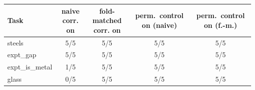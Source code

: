 \begin{tabular}{lcccc}
\toprule
Task & naive corr. on & fold-matched corr. on & perm.\ control on (naive) & perm.\ control on (f.-m.) \\
\midrule
steels & 5/5 & 5/5 & 5/5 & 5/5 \\
expt\_gap & 5/5 & 5/5 & 5/5 & 5/5 \\
expt\_is\_metal & 1/5 & 5/5 & 5/5 & 5/5 \\
glass & 0/5 & 5/5 & 5/5 & 5/5 \\
\bottomrule
\end{tabular}
